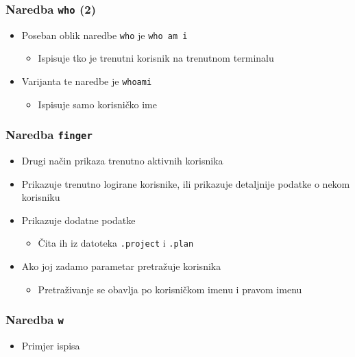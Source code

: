 \documentclass[table,usenames,dvipsnames] {beamer}
\newcommand{\shell}[1]{\texttt{#1}}
\begin{document}
\begin{frame}[t]
\frametitle{Naredba \shell{who} (2)}
\begin{itemize}
  \item Poseban oblik naredbe \shell{who} je \shell{who am i}
  \begin{itemize}
    \item Ispisuje tko je trenutni korisnik na trenutnom terminalu
  \end{itemize}
  \item Varijanta te naredbe je \shell{whoami}
  \begin{itemize}
    \item Ispisuje samo korisničko ime
  \end{itemize}
\end{itemize}
\end{frame}

\begin{frame}[t]
\frametitle{Naredba \shell{finger}}
\begin{itemize}
  \item Drugi način prikaza trenutno aktivnih korisnika
  \item Prikazuje trenutno logirane korisnike, ili prikazuje 
          detaljnije podatke o nekom korisniku
   \item Prikazuje dodatne podatke
   \begin{itemize}
   	\item Čita ih iz datoteka \shell{.project} i \shell{.plan}
   \end{itemize}
   \item Ako joj zadamo parametar pretražuje korisnika
   \begin{itemize}
   	\item Pretraživanje se obavlja po korisničkom imenu i pravom imenu
   \end{itemize}
\end{itemize}
\end{frame}

\begin{frame}[t]
\frametitle{Naredba \shell{w}}
\begin{itemize}
  \item Primjer ispisa
    \begin{table}[h]\footnotesize
    \end{table}
\end{itemize}
\end{frame}
\end{document}
